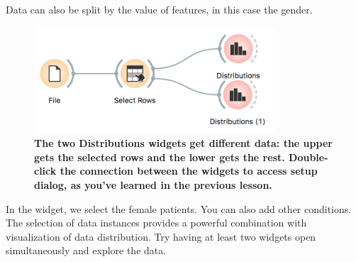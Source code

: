 \newpage
Data can also be split by the value of features, in this case the gender.

\begin{figure}[h]
  \centering
  \includegraphics[width=90mm]{select-rows-workflow.png}%
  \caption{\textbf{\textsf{The two Distributions widgets get different data: the upper gets the selected rows and the lower gets the rest. Double-click the connection between the widgets to access setup dialog, as you've learned in the previous lesson.}}}
  \label{fig:basic_data_exploration-fig3}
\end{figure}

In the  widget, we select the female patients. You can also add other conditions. The selection of data instances provides a powerful combination with visualization of data distribution. Try having at least two widgets open simultaneously and explore the data.

